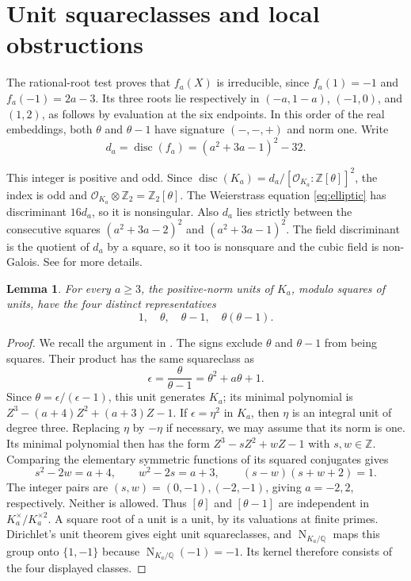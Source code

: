 \documentclass[draft]{publmathdeb}
\newtheorem{lemma}[theorem]{Lemma}
\theoremstyle{remark}
\numberwithin{equation}{section}
\newcommand{\Q}{\mathbb Q}
\newcommand{\Z}{\mathbb Z}
\DeclareMathOperator{\Nm}{N}
\begin{document}
\section{Unit squareclasses and local obstructions}

The rational-root test proves that $f_a(X)$ is irreducible, since $f_a(1)=-1$ and $f_a(-1)=2a-3$. Its three roots lie respectively in $(-a,1-a)$, $(-1,0)$, and $(1,2)$, as follows by evaluation at the six endpoints. In this order of the real embeddings, both $\theta$ and $\theta-1$ have signature $(-,-,+)$ and norm one. Write
\begin{equation}\label{eq:discriminant}
  d_a=\operatorname{disc}(f_a)=(a^2+3a-1)^2-32.
\end{equation}

This integer is positive and odd. Since $\operatorname{disc}(K_a)=d_a/[\mathcal O_{K_a}:\Z[\theta]]^2$, the index is odd and $\mathcal O_{K_a}\otimes\Z_2=\Z_2[\theta]$. The Weierstrass equation \eqref{eq:elliptic} has discriminant $16d_a$, so it is nonsingular. Also $d_a$ lies strictly between the consecutive squares $(a^2+3a-2)^2$ and $(a^2+3a-1)^2$. The field discriminant is the quotient of $d_a$ by a square, so it too is nonsquare and the cubic field is non-Galois. See \cite{Ennola1991} for more details.

\begin{lemma}\label{lem:units}
  For every $a\geq3$, the positive-norm units of $K_a$, modulo squares of units, have the four distinct representatives
  \[
    1,\quad \theta,\quad \theta-1,\quad \theta(\theta-1).
  \]
\end{lemma}

\begin{proof}
  We recall the argument in \cite[Lemma 6]{Louboutin2017}. The signs exclude $\theta$ and $\theta-1$ from being squares. Their product has the same squareclass as
  \[
    \epsilon=\frac{\theta}{\theta-1}=\theta^2+a\theta+1.
  \]
  Since $\theta=\epsilon/(\epsilon-1)$, this unit generates $K_a$; its minimal polynomial is $Z^3-(a+4)Z^2+(a+3)Z-1$. If $\epsilon=\eta^2$ in $K_a$, then $\eta$ is an integral unit of degree three. Replacing $\eta$ by $-\eta$ if necessary, we may assume that its norm is one. Its minimal polynomial then has the form $Z^3-sZ^2+wZ-1$ with $s,w\in\Z$. Comparing the elementary symmetric functions of its squared conjugates gives
  \[
    s^2-2w=a+4,\qquad w^2-2s=a+3,
    \qquad (s-w)(s+w+2)=1.
  \]
  The integer pairs are $(s,w)=(0,-1),(-2,-1)$, giving $a=-2,2$, respectively. Neither is allowed. Thus $[\theta]$ and $[\theta-1]$ are independent in $K_a^\times/K_a^{\times2}$. A square root of a unit is a unit, by its valuations at finite primes. Dirichlet's unit theorem gives eight unit squareclasses, and $\Nm_{K_a/\Q}$ maps this group onto $\{1,-1\}$ because $\Nm_{K_a/\Q}(-1)=-1$. Its kernel therefore consists of the four displayed classes.
\end{proof}
\end{document}
